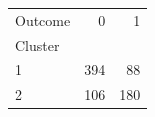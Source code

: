 \begin{tabular}{lrr}
\toprule
Outcome & 0 & 1 \\
Cluster &  &  \\
\midrule
1 & 394 & 88 \\
2 & 106 & 180 \\
\bottomrule
\end{tabular}
